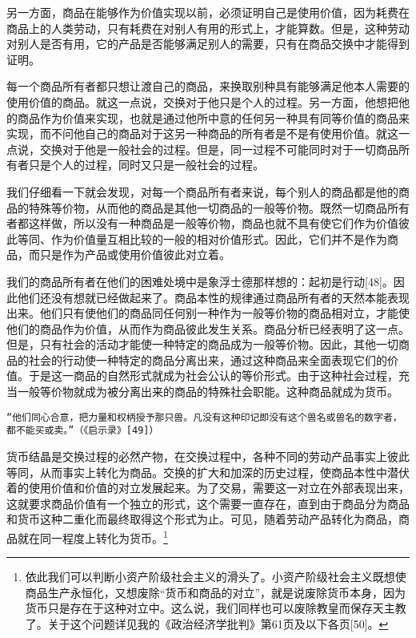 \documentclass{ctexbook}
\begin{document}
另一方面，商品在能够作为价值实现以前，必须证明自己是使用价值，因为耗费在商品上的人类劳动，只有耗费在对别人有用的形式上，才能算数。但是，这种劳动对别人是否有用，它的产品是否能够满足别人的需要，只有在商品交换中才能得到证明。

每一个商品所有者都只想让渡自己的商品，来换取别种具有能够满足他本人需要的使用价值的商品。就这一点说，交换对于他只是个人的过程。另一方面，他想把他的商品作为价值来实现，也就是通过他所中意的任何另一种具有同等价值的商品来实现，而不问他自己的商品对于这另一种商品的所有者是不是有使用价值。就这一点说，交换对于他是一般社会的过程。但是，同一过程不可能同时对于一切商品所有者只是个人的过程，同时又只是一般社会的过程。

我们仔细看一下就会发现，对每一个商品所有者来说，每个别人的商品都是他的商品的特殊等价物，从而他的商品是其他一切商品的一般等价物。既然一切商品所有者都这样做，所以没有一种商品是一般等价物，商品也就不具有使它们作为价值彼此等同、作为价值量互相比较的一般的相对价值形式。因此，它们并不是作为商品，而只是作为产品或使用价值彼此对立着。

我们的商品所有者在他们的困难处境中是象浮士德那样想的：起初是行动[48]。因此他们还没有想就已经做起来了。商品本性的规律通过商品所有者的天然本能表现出来。他们只有使他们的商品同任何别一种作为一般等价物的商品相对立，才能使他们的商品作为价值，从而作为商品彼此发生关系。商品分析已经表明了这一点。但是，只有社会的活动才能使一种特定的商品成为一般等价物。因此，其他一切商品的社会的行动使一种特定的商品分离出来，通过这种商品来全面表现它们的价值。于是这一商品的自然形式就成为社会公认的等价形式。由于这种社会过程，充当一般等价物就成为被分离出来的商品的特殊社会职能。这种商品就成为货币。

\texttt{“他们同心合意，把力量和权柄授予那只兽。凡没有这种印记即没有这个兽名或兽名的数字者，都不能买或卖。”（《启示录》[49]）}

货币结晶是交换过程的必然产物，在交换过程中，各种不同的劳动产品事实上彼此等同，从而事实上转化为商品。交换的扩大和加深的历史过程，使商品本性中潜伏着的使用价值和价值的对立发展起来。为了交易，需要这一对立在外部表现出来，这就要求商品价值有一个独立的形式，这个需要一直存在，直到由于商品分为商品和货币这种二重化而最终取得这个形式为止。可见，随着劳动产品转化为商品，商品就在同一程度上转化为货币。\footnote{依此我们可以判断小资产阶级社会主义的滑头了。小资产阶级社会主义既想使商品生产永恒化，又想废除“货币和商品的对立”，就是说废除货币本身，因为货币只是存在于这种对立中。这么说，我们同样也可以废除教皇而保存天主教了。关于这个问题详见我的《政治经济学批判》第61页及以下各页[50]。}
\end{document}

